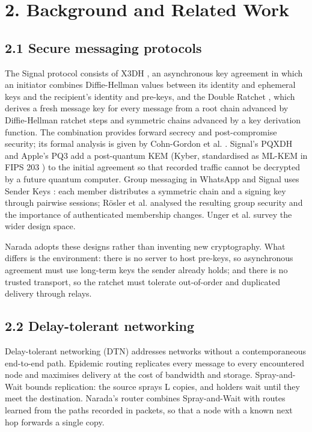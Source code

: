 \documentclass[conference]{IEEEtran}
\begin{document}
\section{2. Background and Related Work}
\subsection{2.1 Secure messaging protocols}
The Signal protocol consists of X3DH \cite{ref1}, an asynchronous key agreement in which an initiator combines Diffie-Hellman values between its identity and ephemeral keys and the recipient's identity and pre-keys, and the Double Ratchet \cite{ref2}, which derives a fresh message key for every message from a root chain advanced by Diffie-Hellman ratchet steps and symmetric chains advanced by a key derivation function. The combination provides forward secrecy and post-compromise security; its formal analysis is given by Cohn-Gordon et al. \cite{ref3}. Signal's PQXDH \cite{ref4} and Apple's PQ3 \cite{ref18} add a post-quantum KEM (Kyber, standardised as ML-KEM in FIPS 203 \cite{ref5}) to the initial agreement so that recorded traffic cannot be decrypted by a future quantum computer. Group messaging in WhatsApp and Signal uses Sender Keys \cite{ref13}: each member distributes a symmetric chain and a signing key through pairwise sessions; Rösler et al. \cite{ref14} analysed the resulting group security and the importance of authenticated membership changes. Unger et al. \cite{ref23} survey the wider design space.

Narada adopts these designs rather than inventing new cryptography. What differs is the environment: there is no server to host pre-keys, so asynchronous agreement must use long-term keys the sender already holds; and there is no trusted transport, so the ratchet must tolerate out-of-order and duplicated delivery through relays.

\subsection{2.2 Delay-tolerant networking}
Delay-tolerant networking (DTN) \cite{ref10} addresses networks without a contemporaneous end-to-end path. Epidemic routing \cite{ref9} replicates every message to every encountered node and maximises delivery at the cost of bandwidth and storage. Spray-and-Wait \cite{ref8} bounds replication: the source sprays L copies, and holders wait until they meet the destination. Narada's router combines Spray-and-Wait with routes learned from the paths recorded in packets, so that a node with a known next hop forwards a single copy.
\end{document}
